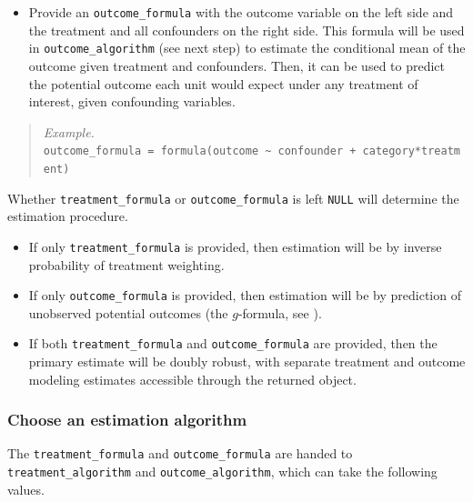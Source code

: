 \documentclass[
]{article}
\providecommand{\tightlist}{%
  \setlength{\itemsep}{0pt}\setlength{\parskip}{0pt}}
\begin{document}
\begin{itemize}
\tightlist
\item
  Provide an \texttt{outcome\_formula} with the outcome variable on the left side and the treatment and all confounders on the right side. This formula will be used in \texttt{outcome\_algorithm} (see next step) to estimate the conditional mean of the outcome given treatment and confounders. Then, it can be used to predict the potential outcome each unit would expect under any treatment of interest, given confounding variables.
\end{itemize}

\begin{quote}
\emph{Example.}\\
\texttt{outcome\_formula\ =\ formula(outcome\ \textasciitilde{}\ confounder\ +\ category*treatment)}
\end{quote}

Whether \texttt{treatment\_formula} or \texttt{outcome\_formula} is left \texttt{NULL} will determine the estimation procedure.

\begin{itemize}
\tightlist
\item
  If only \texttt{treatment\_formula} is provided, then estimation will be by inverse probability of treatment weighting.
\item
  If only \texttt{outcome\_formula} is provided, then estimation will be by prediction of unobserved potential outcomes (the \(g\)-formula, see \citet{hernan2021}).
\item
  If both \texttt{treatment\_formula} and \texttt{outcome\_formula} are provided, then the primary estimate will be doubly robust, with separate treatment and outcome modeling estimates accessible through the returned object.
\end{itemize}

\hypertarget{choose-an-estimation-algorithm}{%
\subsubsection{Choose an estimation algorithm}\label{choose-an-estimation-algorithm}}

The \texttt{treatment\_formula} and \texttt{outcome\_formula} are handed to \texttt{treatment\_algorithm} and \texttt{outcome\_algorithm}, which can take the following values.
\end{document}
